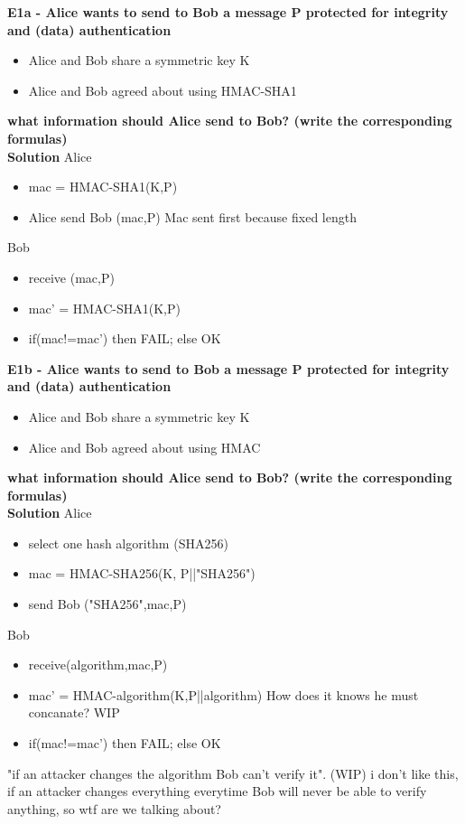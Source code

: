 \textbf{E1a - Alice wants to send to Bob a message P protected for integrity and (data) authentication}
\begin{itemize}
    \item Alice and Bob share a symmetric key K
    \item Alice and Bob agreed about using HMAC-SHA1
\end{itemize}
\textbf{what information should Alice send to Bob? (write the corresponding formulas)\\}
\textbf{Solution}
Alice
\begin{itemize}
    \item mac = HMAC-SHA1(K,P)
    \item Alice send Bob (mac,P) \textcolor{Comment}{Mac sent first because fixed length}
\end{itemize}
Bob
\begin{itemize}
    \item receive (mac,P)
    \item mac' = HMAC-SHA1(K,P)
    \item if(mac!=mac') then FAIL; else OK
\end{itemize}

\textbf{E1b - Alice wants to send to Bob a message P protected for integrity and (data) authentication}
\begin{itemize}
    \item Alice and Bob share a symmetric key K
    \item Alice and Bob agreed about using HMAC
\end{itemize}
\textbf{what information should Alice send to Bob? (write the corresponding formulas)\\}
\textbf{Solution}
Alice
\begin{itemize}
    \item select one hash algorithm (SHA256)
    \item mac = HMAC-SHA256(K, P||"SHA256")
    \item send Bob ("SHA256",mac,P)
\end{itemize}
Bob
\begin{itemize}
    \item receive(algorithm,mac,P)
    \item mac' = HMAC-algorithm(K,P||algorithm) \textcolor{Comment}{How does it knows he must concanate? WIP}
    \item if(mac!=mac') then FAIL; else OK
\end{itemize}
\textcolor{Comment}{"if an attacker changes the algorithm Bob can't verify it". (WIP) i don't like this, 
if an attacker changes everything everytime Bob will never be able to verify anything,  so wtf are we talking about?}



